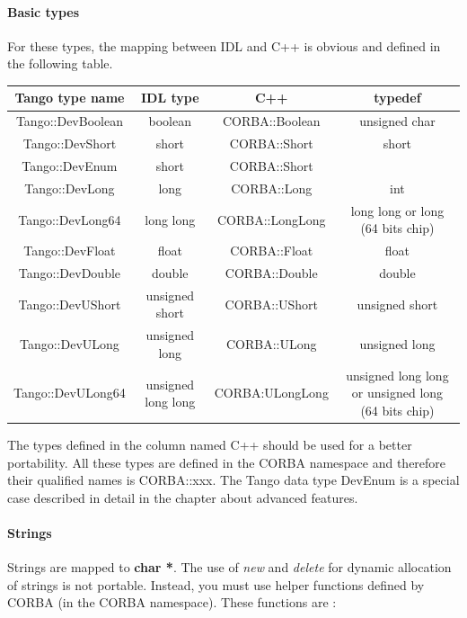 \paragraph{Basic types}

For these types, the mapping between IDL and C++ is obvious and defined
in the following table.

\vspace{0.3cm}


\begin{center}
\begin{longtable}{|c|c|c|c|}
\hline 
Tango type name & IDL type & C++ & typedef\tabularnewline
\hline 
\hline 
Tango::DevBoolean & boolean & CORBA::Boolean & unsigned char\tabularnewline
\hline 
Tango::DevShort & short & CORBA::Short & short\tabularnewline
\hline 
Tango::DevEnum & short & CORBA::Short & \tabularnewline
\hline 
Tango::DevLong & long & CORBA::Long & int\tabularnewline
\hline 
Tango::DevLong64 & long long & CORBA::LongLong & long long or long (64 bits chip)\tabularnewline
\hline 
Tango::DevFloat & float & CORBA::Float & float\tabularnewline
\hline 
Tango::DevDouble & double & CORBA::Double & double\tabularnewline
\hline 
Tango::DevUShort & unsigned short & CORBA::UShort & unsigned short\tabularnewline
\hline 
Tango::DevULong & unsigned long & CORBA::ULong & unsigned long\tabularnewline
\hline 
Tango::DevULong64 & unsigned long long & CORBA:ULongLong & unsigned long long or unsigned long (64 bits chip)\tabularnewline
\hline 
\end{longtable}
\par\end{center}

\vspace{0.3cm}


The types defined in the column named C++ should be used for a better
portability. All these types are defined in the CORBA namespace and
therefore their qualified names is CORBA::xxx. The Tango data type
DevEnum is a special case described in detail in the
chapter about advanced features.


\paragraph{Strings}

Strings are mapped to \textbf{char {*}}. The use of \emph{new} and
\emph{delete} for dynamic allocation of strings is not portable. Instead,
you must use helper functions defined by CORBA (in the CORBA namespace).
These functions are :

